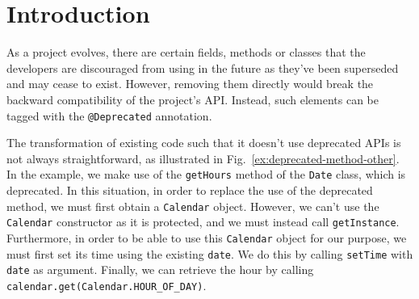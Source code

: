 \documentclass[sigconf,review,anonymous]{acmart}
\begin{document}
\maketitle







\section{Introduction}\label{sec:intro}







As a project evolves, there are certain fields, methods or classes
that the developers are discouraged from using in the future as
they've been superseded and may cease to exist.
However, removing them directly would break the backward compatibility
of the project's API.  Instead, such elements can be tagged with the
\texttt{@Deprecated} annotation.  %


The transformation of existing code such that it doesn't use
deprecated APIs is not always straightforward, as illustrated in
Fig.~\ref{ex:deprecated-method-other}. In the example, we make use of
the \texttt{getHours} method of the \texttt{Date} class, which is
deprecated.  In this situation, in order to replace the use of the
deprecated method, we must first obtain a \texttt{Calendar} object.
However, we can't use the \texttt{Calendar} constructor as it is
protected, and we must instead call \texttt{getInstance}.
Furthermore, in order to be able to use this \texttt{Calendar} object
for our purpose, we must first set its time using the existing
\texttt{date}.  We do this by calling \texttt{setTime} with
\texttt{date} as argument.  Finally, we can retrieve the hour by
calling \texttt{calendar.get(Calendar.HOUR\_OF\_DAY)}.
\end{document}
